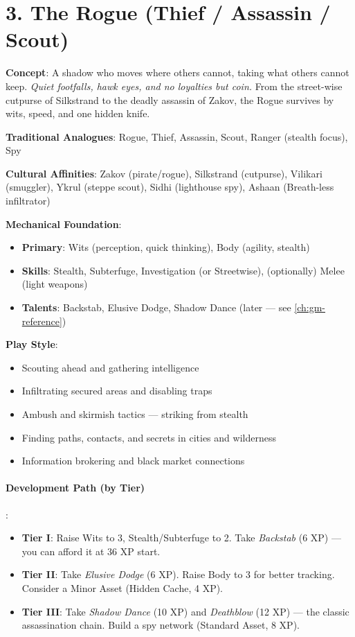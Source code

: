\section{3. The Rogue (Thief / Assassin / Scout)}
\label{sec:concept-rogue}

\textbf{Concept}: A shadow who moves where others cannot, taking what others cannot keep. \emph{Quiet footfalls, hawk eyes, and no loyalties but coin.} From the street-wise cutpurse of Silkstrand to the deadly assassin of Zakov, the Rogue survives by wits, speed, and one hidden knife.

\textbf{Traditional Analogues}: Rogue, Thief, Assassin, Scout, Ranger (stealth focus), Spy

\textbf{Cultural Affinities}: Zakov (pirate/rogue), Silkstrand (cutpurse), Vilikari (smuggler), Ykrul (steppe scout), Sidhi (lighthouse spy), Ashaan (Breath-less infiltrator)

\textbf{Mechanical Foundation}:
\begin{itemize}
\item \textbf{Primary}: Wits (perception, quick thinking), Body (agility, stealth)
\item \textbf{Skills}: Stealth, Subterfuge, Investigation (or Streetwise), (optionally) Melee (light weapons)
\item \textbf{Talents}: Backstab, Elusive Dodge, Shadow Dance (later --- see \ref{ch:gm-reference})
\end{itemize}

\textbf{Play Style}:
\begin{itemize}
\item Scouting ahead and gathering intelligence
\item Infiltrating secured areas and disabling traps
\item Ambush and skirmish tactics --- striking from stealth
\item Finding paths, contacts, and secrets in cities and wilderness
\item Information brokering and black market connections
\end{itemize}

\paragraph{Development Path (by Tier)}:
\begin{itemize}
\item \textbf{Tier I}: Raise Wits to 3, Stealth/Subterfuge to 2. Take \emph{Backstab} (6 XP) --- you can afford it at 36 XP start.
\item \textbf{Tier II}: Take \emph{Elusive Dodge} (6 XP). Raise Body to 3 for better tracking. Consider a Minor Asset (Hidden Cache, 4 XP).
\item \textbf{Tier III}: Take \emph{Shadow Dance} (10 XP) and \emph{Deathblow} (12 XP) --- the classic assassination chain. Build a spy network (Standard Asset, 8 XP).
\end{itemize}

